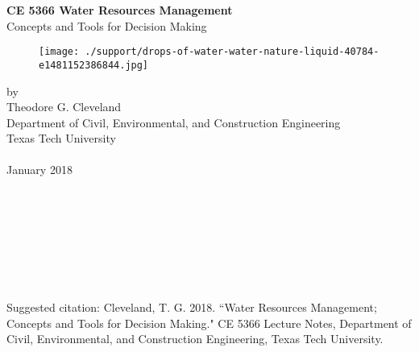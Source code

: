 \documentclass[12pt]{article}
\begin{document}
\begingroup
\begin{center}
\textbf{CE 5366 Water Resources Management}\\{Concepts and Tools for Decision Making}
\end{center}
\begin{figure}[htbp] %
   \centering
   \texttt{[image: ./support/drops-of-water-water-nature-liquid-40784-e1481152386844.jpg]} 
   \label{fig:example}
\end{figure}



\begin{center}
by \\
Theodore G. Cleveland \\
Department of Civil, Environmental, and Construction Engineering \\
Texas Tech University\\
~\\
January 2018 \\
\end{center}
\endgroup
~\\
~\\
~\\
~\\
~\\
~\\
~\\
Suggested citation: Cleveland, T. G. 2018. ``Water Resources Management; Concepts and Tools for Decision Making." 
CE 5366 Lecture Notes, Department of Civil, Environmental, and Construction Engineering, Texas Tech University.
\clearpage
\tableofcontents























\end{document}
